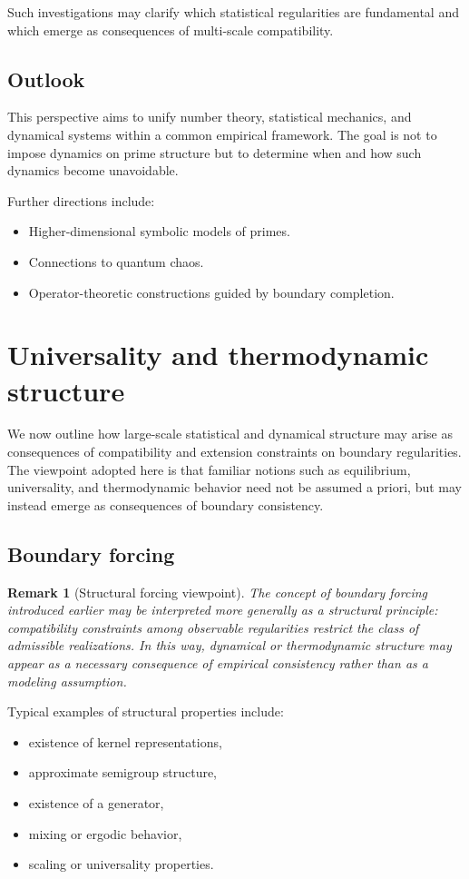 \documentclass[11pt]{article}
\newtheorem{remark}{Remark}
\begin{document}
Such investigations may clarify which statistical regularities are fundamental
and which emerge as consequences of multi-scale compatibility.

\subsection{Outlook}

This perspective aims to unify number theory, statistical mechanics, and
dynamical systems within a common empirical framework. The goal is not to impose
dynamics on prime structure but to determine when and how such dynamics become
unavoidable.

Further directions include:
\begin{itemize}
  \item Higher-dimensional symbolic models of primes.
  \item Connections to quantum chaos.
  \item Operator-theoretic constructions guided by boundary completion.
\end{itemize}

\section{Universality and thermodynamic structure}

We now outline how large-scale statistical and dynamical structure may arise
as consequences of compatibility and extension constraints on boundary
regularities.  The viewpoint adopted here is that familiar notions such as
equilibrium, universality, and thermodynamic behavior need not be assumed a
priori, but may instead emerge as consequences of boundary consistency.

\subsection{Boundary forcing}

\begin{remark}[Structural forcing viewpoint]
The concept of boundary forcing introduced earlier may be interpreted
more generally as a structural principle: compatibility constraints
among observable regularities restrict the class of admissible
realizations.  In this way, dynamical or thermodynamic structure may
appear as a necessary consequence of empirical consistency rather than
as a modeling assumption.
\end{remark}

Typical examples of structural properties include:
\begin{itemize}
  \item existence of kernel representations,
  \item approximate semigroup structure,
  \item existence of a generator,
  \item mixing or ergodic behavior,
  \item scaling or universality properties.
\end{itemize}
\end{document}
